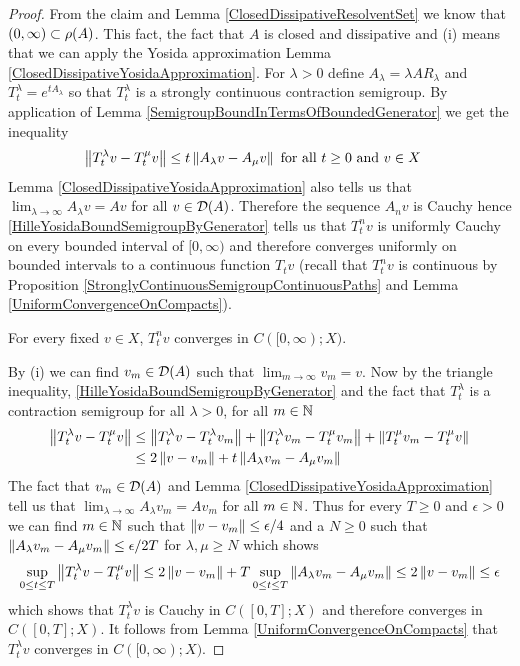 \begin{proof}
From the claim and Lemma \ref{ClosedDissipativeResolventSet} we know that $(0,\infty) \subset \rho(A)$.  This fact, the fact that $A$ is closed and dissipative and (i) means that we can apply the Yosida approximation Lemma \ref{ClosedDissipativeYosidaApproximation}.  For $\lambda>0$ define $A_\lambda =\lambda A R_\lambda$ and $T^\lambda_t = e^{tA_\lambda}$ so that $T^\lambda_t$ is a strongly continuous contraction semigroup.  By application of Lemma \ref {SemigroupBoundInTermsOfBoundedGenerator} we get the inequality
\begin{align}\label{HilleYosidaBoundSemigroupByGenerator}
\left \lVert T^\lambda_tv  - T^\mu_tv \right \rVert &\leq t\left \lVert A_\lambda v - A_\mu v \right \rVert \text{ for all $t\geq 0$ and $v \in X$}
\end{align}
Lemma \ref{ClosedDissipativeYosidaApproximation} also tells us that $\lim_{\lambda \to \infty} A_\lambda v = Av$ for all $v \in \mathcal{D}(A)$.  Therefore the sequence $A_n v$ is Cauchy
hence \eqref{HilleYosidaBoundSemigroupByGenerator} tells us that $T^n_t v$ is uniformly Cauchy on every bounded interval of $[0, \infty)$ and therefore converges uniformly on bounded intervals to a continuous function $T_t v$ (recall that $T^n_t v$ is continuous by Proposition \ref{StronglyContinuousSemigroupContinuousPaths} and Lemma \ref{UniformConvergenceOnCompacts}).

\begin{clm} For every fixed $v \in X$, $T^n_t v$ converges in $C([0,\infty); X)$.
\end{clm}
By (i) we can find $v_m \in \mathcal{D}(A)$ such that $\lim_{m \to \infty} v_m = v$.  
Now by the triangle inequality, \eqref{HilleYosidaBoundSemigroupByGenerator} and the fact that $T^\lambda_t$ is a contraction semigroup for all $\lambda > 0$, for all $m \in \mathbb{N}$
\begin{align*}
\left \lVert T^\lambda_t v - T^\mu_t v \right \rVert &\leq  \left \lVert T^\lambda_t v - T^\lambda_t v_m \right \rVert   + \left \lVert T^\lambda_t v_m - T^\mu_t v_m \right \rVert + \left \lVert T^\mu_t v_m - T^\mu_t v \right \rVert \\
&\leq 2 \left \lVert v -v_m \right \rVert + t \left \lVert A_\lambda v_m - A_\mu v_m \right \rVert
\end{align*}
The fact that $v_m \in \mathcal{D}(A)$ and Lemma \ref{ClosedDissipativeYosidaApproximation} tell us that $\lim_{\lambda \to \infty} A_\lambda v_m = Av_m$  for all $m \in \mathbb{N}$. Thus for every $T \geq 0$ and $\epsilon > 0$ we can find $m \in \mathbb{N}$ such that $\left \lVert v -v_m \right \rVert \leq \epsilon/4$ and a $N \geq 0$ such that $\left \lVert A_\lambda v_m - A_\mu v_m \right \rVert \leq \epsilon/2T$ for $\lambda, \mu \geq N$ which shows
\begin{align*}
\sup_{0 \leq t \leq T} \left \lVert T^\lambda_t v - T^\mu_t v \right \rVert \leq 2 \left \lVert v -v_m \right \rVert + T \sup_{0 \leq t \leq T} \left \lVert A_\lambda v_m - A_\mu v_m \right \rVert \leq 2 \left \lVert v -v_m \right \rVert \leq \epsilon
\end{align*}
which shows that $T^\lambda_t v$ is Cauchy in $C([0,T];X)$ and therefore converges in $C([0,T];X)$.  It follows from Lemma \ref{UniformConvergenceOnCompacts} that $T^\lambda_t v$ converges in $C([0,\infty); X)$.


\end{proof}
